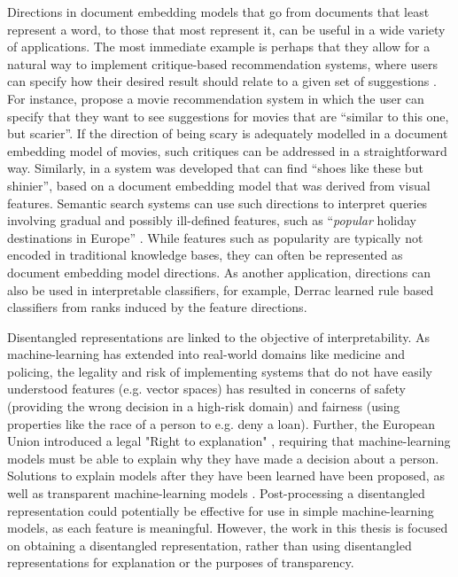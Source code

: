 Directions in document embedding models that go from documents that least represent a word, to those that most represent it, can be useful in a wide variety of applications. The most immediate example is perhaps that they allow for a natural way to implement critique-based recommendation systems, where users can specify how their desired result should relate to a given set of suggestions \cite{Viappiani2006}. For instance, \cite{Vig2014} propose a movie recommendation system in which the user can specify that they want to see suggestions for movies that are ``similar to this one, but scarier''. If the direction of being scary is adequately modelled in a document embedding model of movies, such critiques can be addressed in a straightforward way. Similarly, in \cite{Kovashka} a system was developed that can find ``shoes like these but shinier'', based on a document embedding model that was derived from visual features. Semantic search systems can use such directions to interpret queries involving gradual and possibly ill-defined features, such as ``\emph{popular} holiday destinations in Europe'' \cite{Jameel}. While features such as popularity are typically not encoded in traditional knowledge bases, they can often be represented as document embedding model directions.  As another application, directions can also be used in interpretable classifiers, for example, Derrac \cite{Derrac2015} learned rule based classifiers from ranks induced by the feature directions.

Disentangled representations  are linked to the objective of interpretability. As machine-learning has extended into  real-world domains like medicine and policing,  the legality and risk of implementing systems that do not have easily understood features (e.g. vector spaces) has resulted in concerns of safety \cite{Amodei2016} (providing the wrong decision in a high-risk domain) and fairness \cite{Mehrabi2019} (using properties like  the race of a person to e.g. deny a loan). Further, the European Union introduced a legal "Right to explanation" \cite{Goodman2016}, requiring that machine-learning models must be able to explain why they have made a decision about a person. Solutions to explain models after they have been learned have been proposed, as well as transparent machine-learning models  \cite{Gilpina}.  Post-processing a disentangled representation could potentially be effective for use in simple machine-learning models, as each feature is meaningful. However, the work in this thesis is focused on obtaining a disentangled representation, rather than using disentangled representations for explanation or the purposes of transparency.

